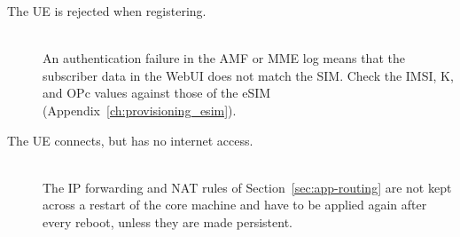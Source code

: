 \begin{description}
    \item[The \gls{UE} is rejected when registering.]~\\
    An authentication failure in the \gls{AMF} or \gls{MME} log means that the subscriber data in the WebUI does not match the SIM. Check the \gls{IMSI}, K, and OPc values against those of the eSIM (Appendix~\ref{ch:provisioning_esim}).

    \item[The \gls{UE} connects, but has no internet access.]~\\
    The IP forwarding and NAT rules of Section~\ref{sec:app-routing} are not kept across a restart of the core machine and have to be applied again after every reboot, unless they are made persistent.
\end{description}

